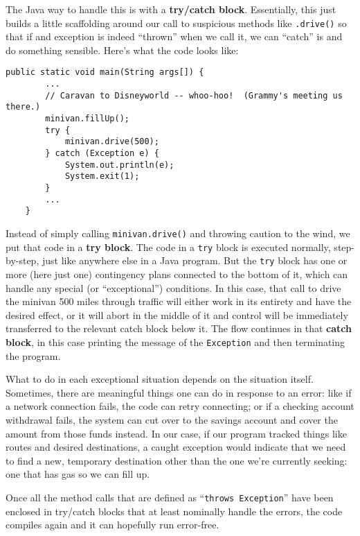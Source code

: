 The Java way to handle this is with a \textbf{try/catch block}. Essentially,
this just builds a little scaffolding around our call to suspicious methods
like \texttt{.drive()} so that if and exception is indeed ``thrown'' when we
call it, we can ``catch'' is and do something sensible. Here's what the code
looks like:

\begin{Verbatim}[samepage=true,fontsize=\scriptsize,frame=single]
    public static void main(String args[]) {
        ...
        // Caravan to Disneyworld -- whoo-hoo!  (Grammy's meeting us there.)
        minivan.fillUp();
        try {
            minivan.drive(500);
        } catch (Exception e) {
            System.out.println(e);
            System.exit(1);
        }
        ...
    }
\end{Verbatim}

Instead of simply calling \texttt{minivan.drive()} and throwing caution to the
wind, we put that code in a \textbf{try block}. The code in a \texttt{try}
block is executed normally, step-by-step, just like anywhere else in a Java
program. But the \texttt{try} block has one or more (here just one)
contingency plans connected to the bottom of it, which can handle any special
(or ``exceptional'') conditions. In this case, that call to drive the minivan
500 miles through traffic will either work in its entirety and have the
desired effect, or it will abort in the middle of it and control will be
immediately transferred to the relevant catch block below it. The flow
continues in that \textbf{catch block}, in this case printing the message of
the \texttt{Exception} and then terminating the program.

What to do in each exceptional situation depends on the situation itself.
Sometimes, there are meaningful things one can do in response to an error:
like if a network connection fails, the code can retry connecting; or if a
checking account withdrawal fails, the system can cut over to the savings
account and cover the amount from those funds instead. In our case, if our
program tracked things like routes and desired destinations, a caught
exception would indicate that we need to find a new, temporary destination
other than the one we're currently seeking: one that has gas so we can fill
up.

Once all the method calls that are defined as ``\texttt{throws Exception}''
have been enclosed in try/catch blocks that at least nominally handle the
errors, the code compiles again and it can hopefully run error-free.

